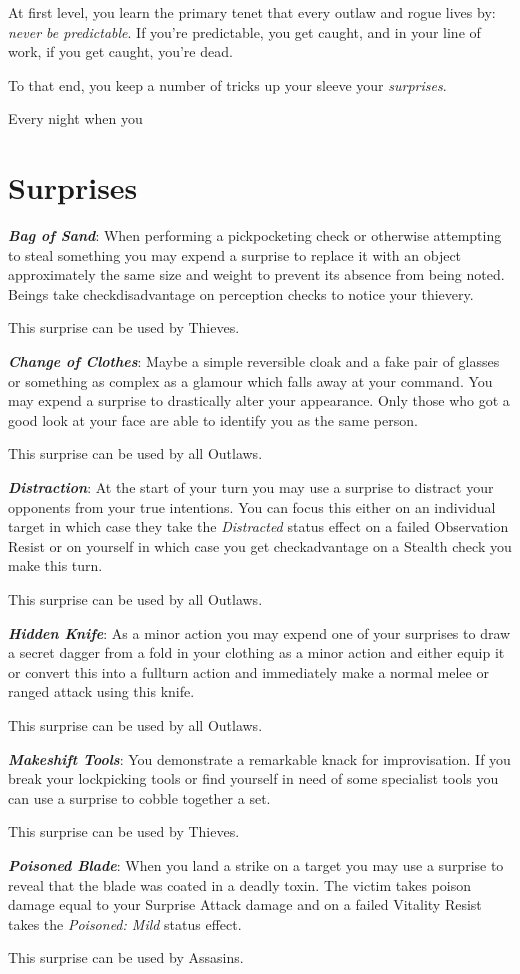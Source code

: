 
At first level, you learn the primary tenet that every outlaw and rogue lives by: {\it never be predictable}. If you're predictable, you get caught, and in your line of work, if you get caught, you're dead.

To that end, you keep a number of tricks up your sleeve \minus{} your {\it surprises}. 

Every night when you 


\section*{Surprises}
\newcommand\surprise[3]
{
{\setlength\parskip{5 pt}
{\large \textbf{\textit{#1}}}: #2


This surprise can be used by {#3}. 

}
}
\surprise{Bag of Sand}{When performing a pickpocketing check\comma{} or otherwise attempting to steal something \minus{} you may expend a surprise to replace it with an object approximately the same size and weight\comma{} to prevent its absence from being noted. Beings take check\minus{}disadvantage on perception checks to notice your thievery.}{Thieves}
\surprise{Change of Clothes}{Maybe a simple reversible cloak\comma{} and a fake pair of glasses \minus{} or something as complex as a glamour which falls away at your command. You may expend a surprise to drastically alter your appearance. Only those who got a good look at your face are able to identify you as the same person.}{all Outlaws}
\surprise{Distraction}{At the start of your turn\comma{} you may use a surprise to distract your opponents from your true intentions. You can focus this either on an individual target  \minus{} in which case they take the {\it Distracted} status effect on a failed Observation Resist\comma{} or on yourself \minus{} in which case\comma{} you get check\minus{}advantage on a Stealth check you make this turn.}{all Outlaws}
\surprise{Hidden Knife}{As a minor action\comma{} you may expend one of your surprises to draw a secret dagger from a fold in your clothing as a minor action and either equip it\comma{} or convert this into a full\minus{}turn action and immediately make a normal melee or ranged attack using this knife.}{all Outlaws}
\surprise{Makeshift Tools}{You demonstrate a remarkable knack for improvisation. If you break your lockpicking tools\comma{} or find yourself in need of some specialist tools\comma{} you can use a surprise to cobble together a set.}{Thieves}
\surprise{Poisoned Blade}{When you land a strike on a target\comma{} you may use a surprise to reveal that the blade was coated in a deadly toxin. The victim takes poison damage equal to your Surprise Attack damage\comma{} and on a failed Vitality Resist takes the {\it Poisoned: Mild} status effect.}{Assasins}
